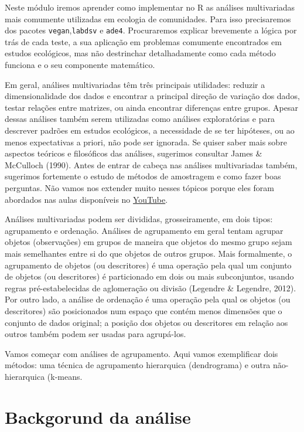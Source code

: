 \documentclass[
]{book}
\begin{document}
Neste módulo iremos aprender como implementar no R as análises multivariadas mais comumente utilizadas em ecologia de comunidades. Para isso precisaremos dos pacotes \texttt{vegan},\texttt{labdsv} e \texttt{ade4}. Procuraremos explicar brevemente a lógica por trás de cada teste, a sua aplicação em problemas comumente encontrados em estudos ecológicos, mas não destrinchar detalhadamente como cada método funciona e o seu componente matemático.

Em geral, análises multivariadas têm três principais utilidades: reduzir a dimensionalidade dos dados e encontrar a principal direção de variação dos dados, testar relações entre matrizes, ou ainda encontrar diferenças entre grupos. Apesar dessas análises também serem utilizadas como análises exploratórias e para descrever padrões em estudos ecológicos, a necessidade de se ter hipóteses, ou ao menos expectativas a priori, não pode ser ignorada. Se quiser saber mais sobre aspectos teóricos e filosóficos das análises, sugerimos consultar James \& McCulloch (1990). Antes de entrar de cabeça nas análises multivariadas também, sugerimos fortemente o estudo de métodos de amostragem e como fazer boas perguntas. Não vamos nos extender muito nesses tópicos porque eles foram abordados nas aulas disponíveis no \href{https://www.youtube.com/playlist?list=PLy2rjqiD2VP5G6pqMo_QlWo7I3yu-uFTk}{YouTube}.

Análises multivariadas podem ser divididas, grosseiramente, em dois tipos: agrupamento e ordenação. Análises de agrupamento em geral tentam agrupar objetos (observações) em grupos de maneira que objetos do mesmo grupo sejam mais semelhantes entre si do que objetos de outros grupos. Mais formalmente, o agrupamento de objetos (ou descritores) é uma operação pela qual um conjunto de objetos (ou descritores) é particionado em dois ou mais subconjuntos, usando regras pré-estabelecidas de aglomeração ou divisão (Legendre \& Legendre, 2012). Por outro lado, a análise de ordenação é uma operação pela qual os objetos (ou descritores) são posicionados num espaço que contém menos dimensões que o conjunto de dados original; a posição dos objetos ou descritores em relação aos outros também podem ser usadas para agrupá-los.

Vamos começar com análises de agrupamento. Aqui vamos exemplificar dois métodos: uma técnica de agrupamento hierarquica (dendrograma) e outra não-hierarquica (k-means.

\hypertarget{backgorund-da-anuxe1lise}{%
\section{Backgorund da análise}\label{backgorund-da-anuxe1lise}}
\end{document}

